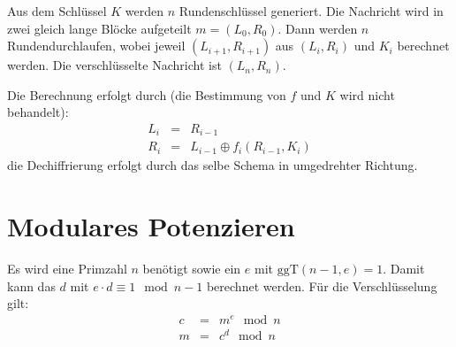 Aus dem Schlüssel $K$ werden $n$ Rundenschlüssel generiert. Die Nachricht wird in zwei
gleich lange Blöcke aufgeteilt $m=(L_0, R_0)$. Dann werden $n$ Rundendurchlaufen, wobei
jeweil $(L_{i+1}, R_{i+1})$ aus $(L_i, R_i)$ und $K_i$ berechnet werden. Die verschlüsselte
Nachricht ist $(L_n, R_n)$.

Die Berechnung erfolgt durch (die Bestimmung von $f$ und $K$ wird nicht behandelt):
\begin{eqnarray}
    L_i &=& R_{i-1} \\
    R_i &=& L_{i-1} \oplus f_i(R_{i-1}, K_i)
\end{eqnarray}
die Dechiffrierung erfolgt durch das selbe Schema in umgedrehter Richtung.

\section{Modulares Potenzieren}
Es wird eine Primzahl $n$ benötigt sowie ein $e$ mit $\text{ggT}(n-1, e) = 1$. Damit kann
das $d$ mit $e \cdot d \equiv 1 \mod n-1$ berechnet werden.
Für die Verschlüsselung gilt:
\begin{eqnarray}
    c &=& m^e \mod n \\
    m &=& c^d \mod n \\
\end{eqnarray}
